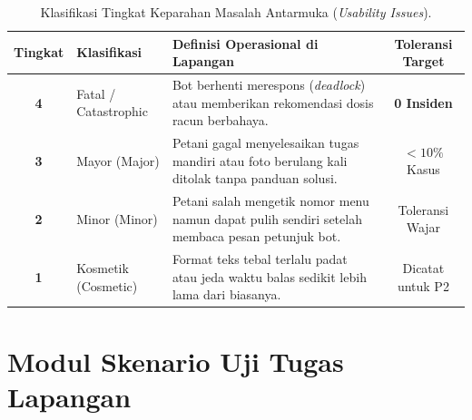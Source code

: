 \documentclass[11pt,a4paper]{article}
\begin{document}
\begin{table}[htbp]
\centering
\small
\caption{Klasifikasi Tingkat Keparahan Masalah Antarmuka (\textit{Usability Issues}).}
\label{tab:severity}
\begin{tabularx}{\textwidth}{c l X c}
\toprule
\textbf{Tingkat} & \textbf{Klasifikasi} & \textbf{Definisi Operasional di Lapangan} & \textbf{Toleransi Target} \\
\midrule
\textbf{4} & Fatal / Catastrophic & Bot berhenti merespons (\textit{deadlock}) atau memberikan rekomendasi dosis racun berbahaya. & \textbf{0 Insiden} \\
\textbf{3} & Mayor (Major) & Petani gagal menyelesaikan tugas mandiri atau foto berulang kali ditolak tanpa panduan solusi. & $< 10\%$ Kasus \\
\textbf{2} & Minor (Minor) & Petani salah mengetik nomor menu namun dapat pulih sendiri setelah membaca pesan petunjuk bot. & Toleransi Wajar \\
\textbf{1} & Kosmetik (Cosmetic) & Format teks tebal terlalu padat atau jeda waktu balas sedikit lebih lama dari biasanya. & Dicatat untuk P2 \\
\bottomrule
\end{tabularx}
\end{table}

\section{Modul Skenario Uji Tugas Lapangan}
\end{document}
